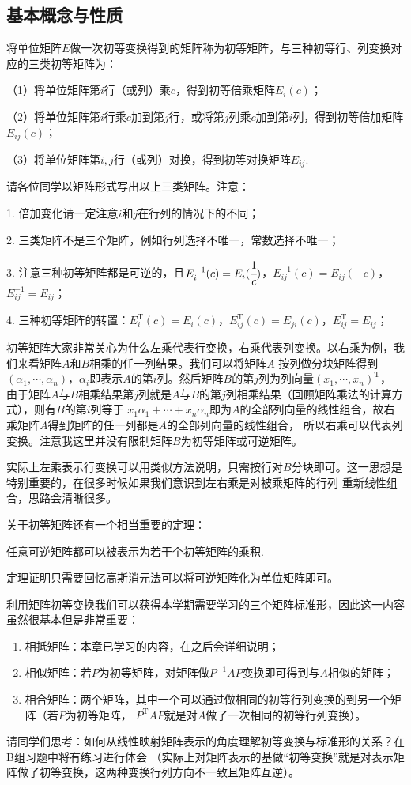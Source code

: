 \subsection{基本概念与性质}
\begin{definition}
	将单位矩阵$E$做一次初等变换得到的矩阵称为初等矩阵，与三种初等行、列变换对应的三类初等矩阵为：
	
	\textup{（1）}将单位矩阵第$i$行（或列）乘$c$，得到初等倍乘矩阵$E_i(c)$\textup{；}

	\textup{（2）}将单位矩阵第$i$行乘$c$加到第$j$行，或将第$j$列乘$c$加到第$i$列，得到初等倍加矩阵$E_{ij}(c)$\textup{；}

	\textup{（3）}将单位矩阵第$i,j$行（或列）对换，得到初等对换矩阵$E_{ij}$.
\end{definition}
请各位同学以矩阵形式写出以上三类矩阵。注意：

1. 倍加变化请一定注意$i$和$j$在行列的情况下的不同；

2. 三类矩阵不是三个矩阵，例如行列选择不唯一，常数选择不唯一；

3. 注意三种初等矩阵都是可逆的，且$E_i^{-1}(c)=E_i(\cfrac{1}{c})$，$E_{ij}^{-1}(c)=E_{ij}(-c)$，$E_{ij}^{-1}=E_{ij}$；

4. 三种初等矩阵的转置：$E_i^\mathrm{T}(c)=E_i(c)$，$E_{ij}^\mathrm{T}(c)=E_{ji}(c)$，$E_{ij}^\mathrm{T}=E_{ij}$；

初等矩阵大家非常关心为什么左乘代表行变换，右乘代表列变换。以右乘为例，我们来看矩阵$A$和$B$相乘的任一列结果。我们可以将矩阵$A$
按列做分块矩阵得到$(\alpha_1,\cdots,\alpha_n)$，$\alpha_i$即表示$A$的第$i$列。然后矩阵$B$的第$j$列为列向量$(x_1,\cdots,x_n)^\mathrm{T}$，
由于矩阵$A$与$B$相乘结果第$j$列就是$A$与$B$的第$j$列相乘结果（回顾矩阵乘法的计算方式），则有$B$的第$i$列等于
$x_1\alpha_1+\cdots+x_n\alpha_n$即为$A$的全部列向量的线性组合，故右乘矩阵$A$得到矩阵的任一列都是$A$的全部列向量的线性组合，
所以右乘可以代表列变换。注意我这里并没有限制矩阵$B$为初等矩阵或可逆矩阵。

实际上左乘表示行变换可以用类似方法说明，只需按行对$B$分块即可。这一思想是特别重要的，在很多时候如果我们意识到左右乘是对被乘矩阵的行列
重新线性组合，思路会清晰很多。

关于初等矩阵还有一个相当重要的定理：
\begin{theorem}
	任意可逆矩阵都可以被表示为若干个初等矩阵的乘积.
\end{theorem}
定理证明只需要回忆高斯消元法可以将可逆矩阵化为单位矩阵即可。

利用矩阵初等变换我们可以获得本学期需要学习的三个矩阵标准形，因此这一内容虽然很基本但是非常重要：
\begin{enumerate}
	\item 相抵矩阵：本章已学习的内容，在之后会详细说明；
	\item 相似矩阵：若$P$为初等矩阵，对矩阵做$P^{-1}AP$变换即可得到与$A$相似的矩阵；
	\item 相合矩阵：两个矩阵，其中一个可以通过做相同的初等行列变换的到另一个矩阵（若$P$为初等矩阵，
	$P^{\mathrm{T}}AP$就是对$A$做了一次相同的初等行列变换）。
\end{enumerate}
请同学们思考：如何从线性映射矩阵表示的角度理解初等变换与标准形的关系？在B组习题中将有练习进行体会
（实际上对矩阵表示的基做“初等变换”就是对表示矩阵做了初等变换，这两种变换行列方向不一致且矩阵互逆）。

